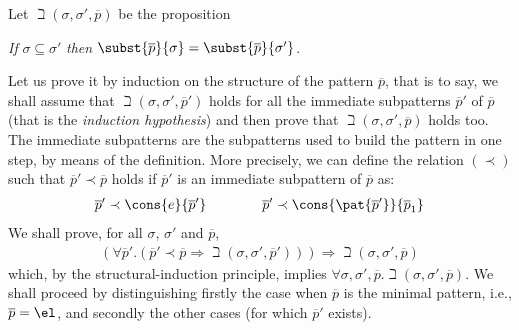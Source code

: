 Let \(\beth(\sigma, \sigma', \overline{p})\) be the proposition
\begin{center}
\emph{If} \(\sigma \subseteq \sigma'\) 
\emph{then} \(\subst{\overline{p}}{\sigma} =
  \subst{\overline{p}}{\sigma'}\).
\end{center}
Let us prove it by induction on the structure of the pattern
\(\overline{p}\), that is to say, we shall assume that \(\beth(\sigma,
\sigma', \overline{p}')\) holds for all the immediate subpatterns
\(\overline{p}'\) of \(\overline{p}\) (that is the \emph{induction
  hypothesis}) and then prove that \(\beth(\sigma, \sigma',
\overline{p})\) holds too. The immediate subpatterns are the
subpatterns used to build the pattern in one step, by means of the
definition. More precisely, we can define the relation \((\prec)\)
such that \(\overline{p}' \prec \overline{p}\) holds if
\(\overline{p}'\) is an immediate subpattern of \(\overline{p}\) as:
\begin{gather*}
\overline{p}' \prec \cons{e}{\overline{p}'} \qquad\qquad 
\overline{p}' \prec \cons{\pat{\overline{p}'}}{\overline{p}_1}
\end{gather*}
We shall prove, for all \(\sigma\), \(\sigma'\) and \(\overline{p}\),
\begin{gather*}
(\forall \overline{p}'.(\overline{p}' \prec \overline{p} \Rightarrow
  \beth(\sigma, \sigma', \overline{p}'))) \Rightarrow \beth(\sigma,
  \sigma', \overline{p})
\end{gather*}
which, by the structural\hyp{}induction principle, implies \(\forall
\sigma, \sigma', \overline{p}.\beth(\sigma, \sigma',
\overline{p})\). We shall proceed by distinguishing firstly the case
when \(\overline{p}\) is the minimal pattern, i.e., \(\overline{p} =
\el\), and secondly the other cases (for which \(\overline{p}'\)
exists).
